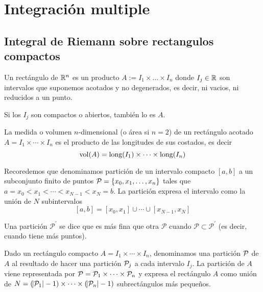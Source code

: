 \section{Integración multiple}


\subsection{Integral de Riemann sobre rectangulos compactos}

\begin{defi}
	Un rectángulo de $\mathbb{R}^n$ es un producto $A := I_1 \times \dots \times I_n$
	donde $I_j \in \mathbb{R}$ son intervalos que suponemos acotados y no degenerados,
	es decir, ni vacios, ni reducidos a un punto.
	
	Si los $I_j$ son compactos o abiertos, también lo es $A$.
\end{defi}

\begin{defi}
	La medida o volumen $n$-dimensional (o área si $n=2$) de un rectángulo
	acotado $A = I_1 \times \cdots \times I_n$ es el producto de las longitudes
	de sus costados, es decir
	\[
		\operatorname{vol}(A) = \text{long} (I_1) \times \dots \times \text{long} (I_n)
	\]
\end{defi}

\begin{obs}
	Recoredemos que denominamos partición de un intervalo compacto $[a,b]$ a un
	subconjunto finito de puntos $\mathcal{P}=\left\{x_0,x_1,\dots,x_n\right\}$ tales que
	$a = x_0 < x_1 < \cdots < x_{N-1} < x_N = b$. La partición expresa el intervalo
	como la unión de $N$ subintervalos
	\[
		[a,b] = [x_0,x_1] \cup \cdots \cup [x_{N-1},x_N]
	\]
\end{obs}
\begin{obs*}
	Una partición $\mathcal{P}^\prime$ se dice que es más fina que otra
	$\mathcal{P}$ cuando $\mathcal{P} \subset \mathcal{P}^\prime$ (es decir, cuando
	tiene más puntos).
\end{obs*}

\begin{defi}
	Dado un rectángulo compacto $A = I_1 \times \cdots \times I_n$, denominamos
	una partición $\mathcal{P}$ de $A$ al resultado de hacer una partición $\mathcal{P}_j$ a cada
	intervalo $I_j$.
	La partición de $A$ viene representada por $\mathcal{P} = \mathcal{P}_1 \times \cdots \times
	\mathcal{P}_n$ y expresa el rectángulo $A$ como unión de $N = (\abs{\mathcal{P}_1}-1) \times
	\cdots \times (\abs{\mathcal{P}_n}-1)$ subrectángulos más pequeños.
\end{defi}

